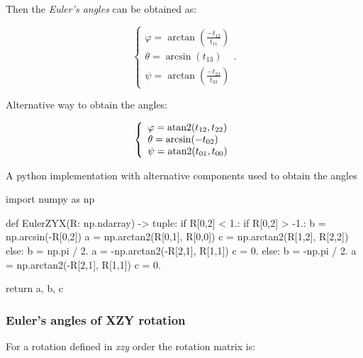     Then the \textit{Euler's angles} can be obtained as:

    \begin{equation}
        \left\{ \begin{array}{l}
            \varphi = \arctan \left( \frac{-t_{12}}{t_{11}} \right)\\
            \theta = \arcsin \left( t_{13} \right) \\
            \psi = \arctan \left( \frac{-t_{23}}{t_{33}} \right)
        \end{array} \right.
    .\end{equation}

    Alternative way to obtain the angles:

    \begin{equation}
        \left\{ \begin{array}{l}
            \varphi = \operatorname{atan2}(t_{12}, t_{22}) \\
            \theta = \arcsin(-t_{02}) \\
            \psi = \operatorname{atan2}(t_{01}, t_{00})
        \end{array} \right.
    \end{equation}

    A python implementation with alternative components used to obtain the angles

\begin{python}
import numpy as np

def EulerZYX(R: np.ndarray) -> tuple:
    if R[0,2] < 1.:
        if R[0,2] > -1.:
            b = np.arcsin(-R[0,2])
            a = np.arctan2(R[0,1], R[0,0])
            c = np.arctan2(R[1,2], R[2,2])
        else:
            b = np.pi / 2.
            a = -np.arctan2(-R[2,1], R[1,1])
            c = 0.
    else:
        b = -np.pi / 2.
        a = np.arctan2(-R[2,1], R[1,1])
        c = 0.

    return a, b, c
\end{python}


\subsubsection{Euler's angles of \textbf{XZY} rotation}

    For a rotation defined in \textit{xzy} order the rotation matrix is:

